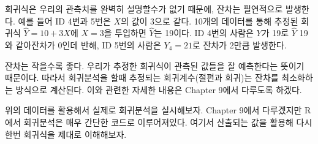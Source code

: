 \documentclass[
]{book}
\begin{document}
회귀식은 우리의 관측치를 완벽히 설명할수가 없기 때문에, 잔차는 필연적으로 발생한다. 예를 들어 ID 4번과 5번은 \(X\)의 값이 3으로 같다. 10개의 데이터를 통해 추정된 회귀식 \(\hat{Y}=10+3X\)에 \(X=3\)을 투입하면 \(\hat{Y}\)는 19이다. ID 4번의 사람은 \(Y\)가 19로 \(\hat{Y}\) 19와 같아잔차가 0인데 반해, ID 5번의 사람은 \(Y_4=21\)로 잔차가 2만큼 발생한다.

잔차는 작을수록 좋다. 우리가 추정한 회귀식이 관측된 값들을 잘 예측한다는 뜻이기 때문이다. 따라서 회귀분석을 할때 추정되는 회귀계수(절편과 회귀)는 잔차를 최소화하는 방식으로 계산된다. 이와 관련한 자세한 내용은 Chapter 9에서 다루도록 하겠다.

위의 데이터를 활용해서 실제로 회귀분석을 실시해보자. Chapter 9에서 다루겠지만 R에서 회귀분석은 매우 간단한 코드로 이루어져있다. 여기서 산출되는 값을 활용해 다시 한번 회귀식을 제대로 이해해보자.
\end{document}

